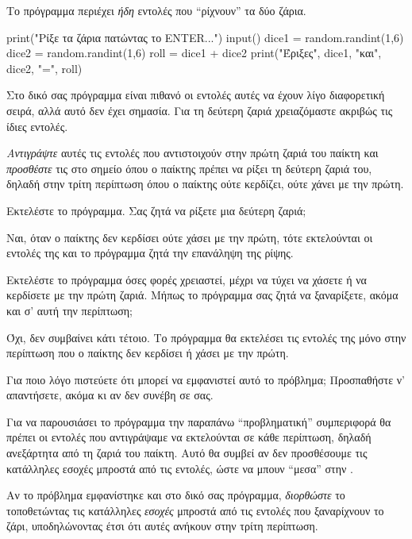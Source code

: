 \documentclass[a4paper,11pt,oneside]{book}
\begin{document}
\begin{step}
Το πρόγραμμα περιέχει \emph{ήδη} εντολές που ``ρίχνουν'' τα δύο ζάρια. 

\begin{pyplain}
print("Ρίξε τα ζάρια πατώντας το ENTER...")
input()
dice1 = random.randint(1,6)
dice2 = random.randint(1,6)
roll = dice1 + dice2
print("Έριξες", dice1, "και", dice2, "=", roll)
\end{pyplain}

Στο δικό σας πρόγραμμα είναι πιθανό οι εντολές αυτές να έχουν λίγο διαφορετική σειρά, αλλά αυτό δεν έχει σημασία. Για τη δεύτερη ζαριά χρειαζόμαστε ακριβώς τις ίδιες εντολές.

\emph{Αντιγράψτε} αυτές τις εντολές που αντιστοιχούν στην πρώτη ζαριά του παίκτη και \emph{προσθέστε} τις στο σημείο όπου ο παίκτης πρέπει να ρίξει τη δεύτερη ζαριά του, δηλαδή στην τρίτη περίπτωση όπου ο παίκτης ούτε κερδίζει, ούτε χάνει με την πρώτη.

Εκτελέστε το πρόγραμμα. Σας ζητά να ρίξετε μια δεύτερη ζαριά;

\begin{answer}
Ναι, όταν ο παίκτης δεν κερδίσει ούτε χάσει με την πρώτη, τότε εκτελούνται οι εντολές της  και το πρόγραμμα ζητά την επανάληψη της ρίψης.
\end{answer}

Εκτελέστε το πρόγραμμα όσες φορές χρειαστεί, μέχρι να τύχει να χάσετε ή να κερδίσετε με την πρώτη ζαριά. Μήπως το πρόγραμμα σας ζητά να ξαναρίξετε, ακόμα και σ' αυτή την περίπτωση;

\begin{answer}
Όχι, δεν συμβαίνει κάτι τέτοιο. Το πρόγραμμα θα εκτελέσει τις εντολές της  μόνο στην περίπτωση που ο παίκτης δεν κερδίσει ή χάσει με την πρώτη.
\end{answer}

Για ποιο λόγο πιστεύετε ότι μπορεί να εμφανιστεί αυτό το πρόβλημα; Προσπαθήστε ν' απαντήσετε, ακόμα κι αν δεν συνέβη σε σας.

\begin{answer}
Για να παρουσιάσει το πρόγραμμα την παραπάνω ``προβληματική'' συμπεριφορά θα πρέπει οι εντολές που αντιγράψαμε να εκτελούνται σε κάθε περίπτωση, δηλαδή ανεξάρτητα από τη ζαριά του παίκτη. Αυτό θα συμβεί αν δεν προσθέσουμε τις κατάλληλες εσοχές μπροστά από τις εντολές, ώστε να μπουν ``μεσα'' στην .
\end{answer}

\marginnote[18pt]{\iconcaution}
Αν το πρόβλημα εμφανίστηκε και στο δικό σας πρόγραμμα, \emph{διορθώστε} το τοποθετώντας τις κατάλληλες \emph{εσοχές} μπροστά από τις εντολές που ξαναρίχνουν το ζάρι, υποδηλώνοντας έτσι ότι αυτές ανήκουν στην τρίτη περίπτωση.
\end{step}
\end{document}
